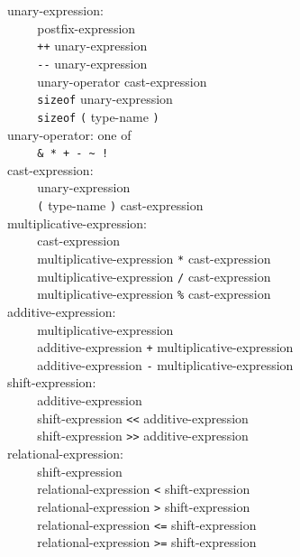 \documentclass[12pt]{report}
\def\|{\verb|}
\begin{document}
% 単項式
\noindent
unary-expression:\\
\|    | postfix-expression\\
\|    | \verb|++| unary-expression\\
\|    | \verb+--+ unary-expression\\
\|    | unary-operator cast-expression\\
\|    | \verb+sizeof+ unary-expression\\
\|    | \verb+sizeof+ \verb+(+ type-name \verb+)+\\

\noindent
unary-operator: {\rm one of}\\
\|    | \verb|& * + - ~ !|\\

\noindent
cast-expression:\\
\|    | unary-expression\\
\|    | \verb+(+ type-name \verb+)+ cast-expression\\

\noindent
multiplicative-expression:\\
\|    | cast-expression\\
\|    | multiplicative-expression \verb+*+ cast-expression\\
\|    | multiplicative-expression \verb+/+ cast-expression\\
\|    | multiplicative-expression \verb+%+ cast-expression\\

\noindent
additive-expression:\\
\|    | multiplicative-expression\\
\|    | additive-expression \verb|+| multiplicative-expression\\
\|    | additive-expression \verb+-+ multiplicative-expression\\

\noindent
shift-expression:\\
\|    | additive-expression\\
\|    | shift-expression \verb+<<+ additive-expression\\
\|    | shift-expression \verb+>>+ additive-expression\\

\noindent
relational-expression:\\
\|    | shift-expression\\
\|    | relational-expression \verb+<+ shift-expression\\
\|    | relational-expression \verb+>+ shift-expression\\
\|    | relational-expression \verb+<=+ shift-expression\\
\|    | relational-expression \verb+>=+ shift-expression\\
\end{document}
